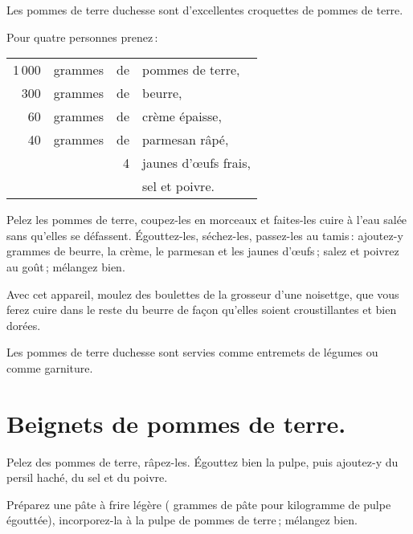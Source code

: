 Les pommes de terre duchesse sont d'excellentes croquettes de pommes de terre.

Pour quatre personnes prenez :

\footnotesize
\begin{longtable}{rrrp{16em}}
  1 000 & grammes & de & pommes de terre,                                                                 \\
    300 & grammes & de & beurre,                                                                          \\
     60 & grammes & de & crème épaisse,                                                                   \\
     40 & grammes & de & parmesan râpé,                                                                   \\
        &         &  4 & jaunes d'œufs frais,                                                             \\
        &         &    & sel et poivre.                                                                   \\
\end{longtable}
\normalsize

Pelez les pommes de terre, coupez-les en morceaux et faites-les cuire à l'eau
salée sans qu'elles se défassent. Égouttez-les, séchez-les, passez-les au
tamis : ajoutez-y {\mmm} grammes de beurre, la crème, le parmesan et les
jaunes d'œufs ; salez et poivrez au goût ; mélangez bien.

Avec cet appareil, moulez des boulettes de la grosseur d'une noisettge, que
vous ferez cuire dans le reste du beurre de façon qu'elles soient
croustillantes et bien dorées.

\medskip

Les pommes de terre duchesse sont servies comme entremets de légumes ou comme
garniture.

\section*{\centering Beignets de pommes de terre.}
{}

Pelez des pommes de terre, râpez-les. Égouttez bien la pulpe, puis ajoutez-y du
persil haché, du sel et du poivre.

Préparez une pâte à frire légère ({\mmm} grammes de pâte pour
{\mmm} kilogramme de pulpe égouttée), incorporez-la à la pulpe de pommes
de terre ; mélangez bien.

